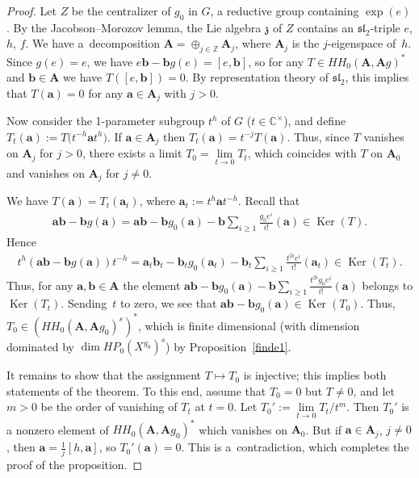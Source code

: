 \documentclass[pdftex]{sigma}
\numberwithin{equation}{section}
\begin{document}
\begin{proof} Let $Z$ be the centralizer of $g_0$ in $G$, a reductive group containing $\exp(e)$. By the Jacobson--Morozov lemma, the Lie algebra $\mathfrak{z}$ of $Z$ contains an $\mathfrak{sl}_2$-triple
$e$, $h$, $f$. We have a~decomposition ${\mathbf A}=\oplus_{j\in {\mathbb Z}}{\mathbf A}_j$, where ${\mathbf A}_j$ is the $j$-eigenspace of~$h$. Since $g(e)=e$, we have $e{\mathbf b}-{\mathbf b}g(e)=[e,{\mathbf b}]$, so for any $T\in HH_0({\mathbf A},{\mathbf A}g)^*$ and ${\mathbf b}\in {\mathbf A}$ we have $T([e,{\mathbf b}])=0$. By representation theory of $\mathfrak{sl}_2$, this implies that $T({\mathbf a})=0$ for any ${\mathbf a}\in {\mathbf A}_j$ with $j>0$.

Now consider the 1-parameter subgroup $t^h$ of $G$ ($t\in {\mathbb C}^\times$), and define
$T_t({\mathbf a}):=T\big(t^{-h}{\mathbf a}t^h\big)$. If ${\mathbf a}\in {\mathbf A}_j$ then $T_t({\mathbf a})=t^{-j}T({\mathbf a})$. Thus, since $T$ vanishes on ${\mathbf A}_j$ for $j>0$, there exists a limit $T_0=\lim\limits_{t\to 0}T_t$, which coincides with $T$ on ${\mathbf A}_0$ and vanishes on ${\mathbf A}_j$ for $j\ne 0$.

We have $T({\mathbf a})=T_t({\mathbf a}_t)$, where ${\mathbf a}_t:=t^h{\mathbf a} t^{-h}$.
Recall that
\begin{gather*}
{\mathbf a}{\mathbf b}-{\mathbf b} g({\mathbf a})={\mathbf a}{\mathbf b}-{\mathbf b}g_0({\mathbf a})-{\mathbf b}\sum_{i\ge 1}\frac{g_0e^i}{i!}({\mathbf a})\in \operatorname{Ker}(T).
\end{gather*}
Hence
\begin{gather*}
t^h({\mathbf a}{\mathbf b}-{\mathbf b} g({\mathbf a}))t^{-h}={\mathbf a}_t{\mathbf b}_t-{\mathbf b}_t g_0({\mathbf a}_t)-{\mathbf b}_t\sum_{i\ge 1}\frac{t^{2i}e^i}{i!}({\mathbf a}_t)\in \operatorname{Ker}(T_t).
\end{gather*}
Thus, for any ${\mathbf a},{\mathbf b}\in {\mathbf A}$ the element ${\mathbf a}{\mathbf b}- {\mathbf b} g_0({\mathbf a})-{\mathbf b}\sum\limits_{i\ge 1}\frac{t^{2i}g_0e^i}{i!}({\mathbf a})$ belongs to $\operatorname{Ker}(T_t)$. Sending~$t$ to zero, we see that ${\mathbf a}{\mathbf b}-{\mathbf b} g_0({\mathbf a})\in \operatorname{Ker}(T_0)$. Thus, $T_0\in (HH_0({\mathbf A},{\mathbf A}g_0)^s)^*$, which is finite dimensional (with dimension dominated by $\dim HP_0(X^{g_0})^s$) by Proposition~\ref{finde1}.

It remains to show that the assignment $T\mapsto T_0$ is injective; this implies both statements of the theorem. To this end, assume that $T_0=0$ but $T\ne 0$, and let $m>0$ be the order of vanishing of $T_t$ at $t=0$. Let $T_0':=\lim\limits_{t\to 0}T_t/t^m$. Then $T_0'$ is a nonzero element of $HH_0({\mathbf A},{\mathbf A}g_0)^*$ which vanishes on ${\mathbf A}_0$. But if ${\mathbf a}\in {\mathbf A}_j$, $j\ne 0$, then ${\mathbf a}=\frac{1}{j}[h,{\mathbf a}]$, so $T_0'({\mathbf a})=0$. This is a~contradiction, which completes the proof of the proposition.
\end{proof}
\end{document}
